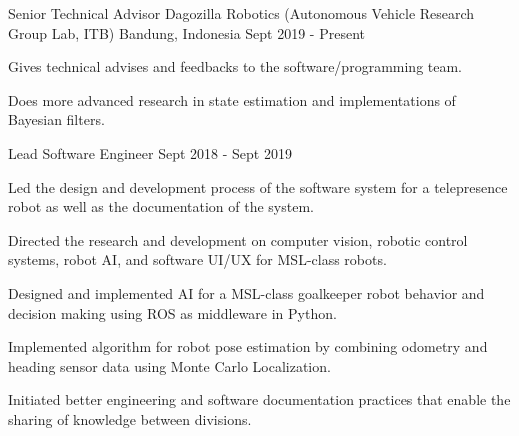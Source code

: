 

\begin{cventries}

    \cventry
    {Senior Technical Advisor} %
    {Dagozilla Robotics (Autonomous Vehicle Research Group Lab, ITB)} %
    {Bandung, Indonesia} %
    {Sept 2019 - Present} %
    {
        \begin{cvitems} %
            \item {Gives technical advises and feedbacks to the software/programming team.}
            \item {Does more advanced research in state estimation and implementations of Bayesian filters.}
        \end{cvitems}
    }

  \cventry
	{Lead Software Engineer} %
	{} %
	{} %
	{Sept 2018 - Sept 2019} %
	{
	  \begin{cvitems} %
	  	\item {Led the design and development process of the software system for a telepresence robot as well as the documentation of the system.}
		\item {Directed the research and development on computer vision, robotic control systems, robot AI, and software UI/UX for MSL-class robots.}
		\item {Designed and implemented AI for a MSL-class goalkeeper robot behavior and decision making using ROS as middleware in Python.}
		\item {Implemented algorithm for robot pose estimation by combining odometry and heading sensor data using Monte Carlo Localization.}
		\item {Initiated better engineering and software documentation practices that enable the sharing of knowledge between divisions.}
	  \end{cvitems}
	}


\end{cventries}
